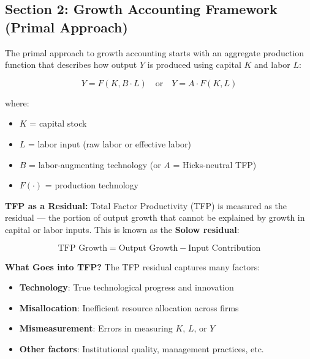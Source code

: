 \subsection*{Section 2: Growth Accounting Framework (Primal Approach)}

The primal approach to growth accounting starts with an aggregate production function that describes how output $Y$ is produced using capital $K$ and labor $L$:

\begin{equation}
    Y = F(K, B \cdot L) \quad \text{or} \quad Y = A \cdot F(K, L)
\end{equation}

where:
\begin{itemize}
    \item $K$ = capital stock
    \item $L$ = labor input (raw labor or effective labor)
    \item $B$ = labor-augmenting technology (or $A$ = Hicks-neutral TFP)
    \item $F(\cdot)$ = production technology
\end{itemize}

\vspace{0.3cm}

\textbf{TFP as a Residual:} Total Factor Productivity (TFP) is measured as the residual --- the portion of output growth that cannot be explained by growth in capital or labor inputs. This is known as the \textbf{Solow residual}:

\begin{equation}
    \boxed{\text{TFP Growth} = \text{Output Growth} - \text{Input Contribution}}
\end{equation}

\vspace{0.3cm}

\textbf{What Goes into TFP?} The TFP residual captures many factors:

\begin{itemize}
    \item \textbf{Technology}: True technological progress and innovation
    \item \textbf{Misallocation}: Inefficient resource allocation across firms
    \item \textbf{Mismeasurement}: Errors in measuring $K$, $L$, or $Y$
    \item \textbf{Other factors}: Institutional quality, management practices, etc.
\end{itemize}

